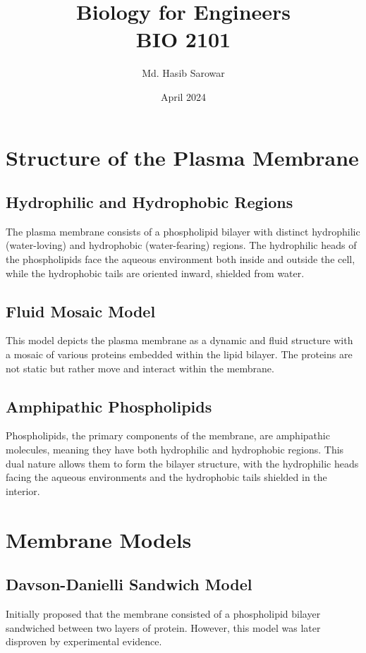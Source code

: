 \documentclass{article}
\title{Biology for Engineers \\ BIO 2101}
\author{Md. Hasib Sarowar}
\date{April 2024}
\begin{document}
\maketitle
\newpage

\section*{Structure of the Plasma Membrane}

\subsection{Hydrophilic and Hydrophobic Regions}
The plasma membrane consists of a phospholipid bilayer with distinct hydrophilic (water-loving) and hydrophobic (water-fearing) regions. The hydrophilic heads of the phospholipids face the aqueous environment both inside and outside the cell, while the hydrophobic tails are oriented inward, shielded from water.

\subsection{Fluid Mosaic Model}
This model depicts the plasma membrane as a dynamic and fluid structure with a mosaic of various proteins embedded within the lipid bilayer. The proteins are not static but rather move and interact within the membrane.

\subsection{Amphipathic Phospholipids}
Phospholipids, the primary components of the membrane, are amphipathic molecules, meaning they have both hydrophilic and hydrophobic regions. This dual nature allows them to form the bilayer structure, with the hydrophilic heads facing the aqueous environments and the hydrophobic tails shielded in the interior.

\section*{Membrane Models}

\subsection{Davson-Danielli Sandwich Model}
Initially proposed that the membrane consisted of a phospholipid bilayer sandwiched between two layers of protein. However, this model was later disproven by experimental evidence.
\end{document}
